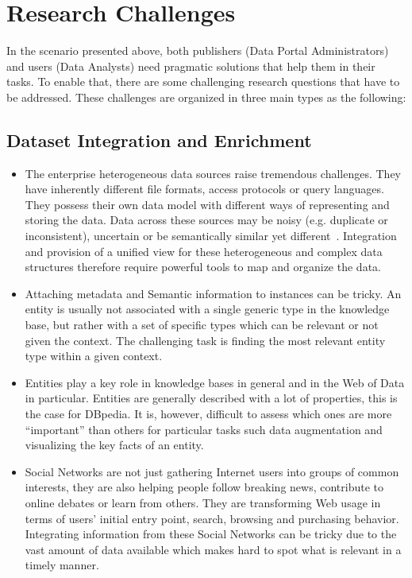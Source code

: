 \section{Research Challenges} \label{sec:challenges}

In the scenario presented above, both publishers (Data Portal Administrators) and users (Data Analysts) need pragmatic solutions that help them in their tasks. To enable that, there are some challenging research questions that have to be addressed. These challenges are organized in three main types as the following:

\subsection{Dataset Integration and Enrichment}
\begin{itemize}
	\item The enterprise heterogeneous data sources raise tremendous challenges. They have inherently different file formats, access protocols or query languages. They possess their own data model with different ways of representing and storing the data. Data across these sources may be noisy (e.g. duplicate or inconsistent), uncertain or be semantically similar yet different~\cite{Avitha:EuroJorunal:11}. Integration and provision of a unified view for these heterogeneous and complex data structures therefore require powerful tools to map and organize the data.
	\item Attaching metadata and Semantic information to instances can be tricky. An entity is usually not associated with a single generic type in the knowledge base, but rather with a set of specific types which can be relevant or not given the context. The challenging task is finding the most relevant entity type within a given context.
	\item Entities play a key role in knowledge bases in general and in the Web of Data in particular. Entities are generally described with a lot of properties, this is the case for DBpedia. It is, however, difficult to assess which ones are more ``important'' than others for particular tasks such data augmentation and visualizing the key facts of an entity.
	\item Social Networks are not just gathering Internet users into groups of common interests, they are also helping people follow breaking news, contribute to online debates or learn from others. They are transforming Web usage in terms of users' initial entry point, search, browsing and purchasing behavior. Integrating information from these Social Networks can be tricky due to the vast amount of data available which makes hard to spot what is relevant in a timely manner.
\end{itemize}

